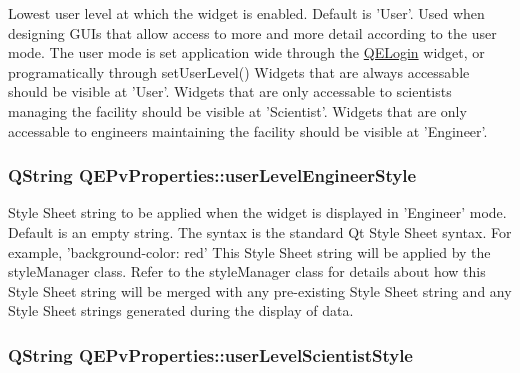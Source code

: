Lowest user level at which the widget is enabled. Default is 'User'. Used when designing GUIs that allow access to more and more detail according to the user mode. The user mode is set application wide through the \hyperlink{classQELogin}{QELogin} widget, or programatically through setUserLevel() Widgets that are always accessable should be visible at 'User'. Widgets that are only accessable to scientists managing the facility should be visible at 'Scientist'. Widgets that are only accessable to engineers maintaining the facility should be visible at 'Engineer'. \hypertarget{classQEPvProperties_adbcc38c93b8efc6ea3c809a95fb7ecac}{
\subsubsection[{userLevelEngineerStyle}]{\setlength{\rightskip}{0pt plus 5cm}QString QEPvProperties::userLevelEngineerStyle}}
\label{classQEPvProperties_adbcc38c93b8efc6ea3c809a95fb7ecac}
Style Sheet string to be applied when the widget is displayed in 'Engineer' mode. Default is an empty string. The syntax is the standard Qt Style Sheet syntax. For example, 'background-\/color: red' This Style Sheet string will be applied by the styleManager class. Refer to the styleManager class for details about how this Style Sheet string will be merged with any pre-\/existing Style Sheet string and any Style Sheet strings generated during the display of data. \hypertarget{classQEPvProperties_aec6d7d2e947defa3001578d26cdeec79}{
\subsubsection[{userLevelScientistStyle}]{\setlength{\rightskip}{0pt plus 5cm}QString QEPvProperties::userLevelScientistStyle}}
\label{classQEPvProperties_aec6d7d2e947defa3001578d26cdeec79}
